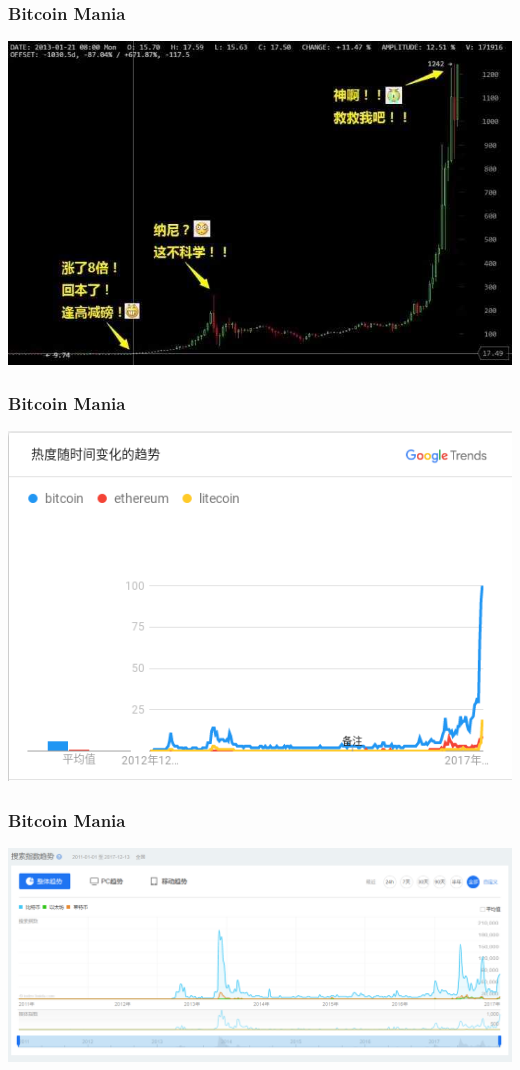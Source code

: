 \begin{frame}
    \frametitle{Bitcoin Mania}
    \includegraphics[scale=0.3]{./figures/bitcoin-invest2.jpg}
\end{frame}

\begin{frame}
    \frametitle{Bitcoin Mania}
    \includegraphics[scale=0.4]{./figures/bitcoin-google-trends.png}
\end{frame}

\begin{frame}
    \frametitle{Bitcoin Mania}
    \includegraphics[scale=0.26]{./figures/bitcoin-baidu-index.png}
\end{frame}

